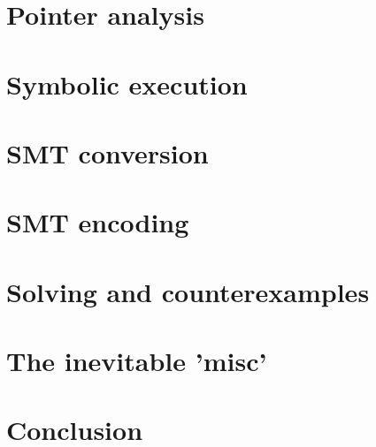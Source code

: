 \documentclass{article}
\begin{document}
\section{Pointer analysis}
\section{Symbolic execution}
\section{SMT conversion}
\section{SMT encoding}
\section{Solving and counterexamples}
\section{The inevitable 'misc'}
\section{Conclusion}
\end{document}
